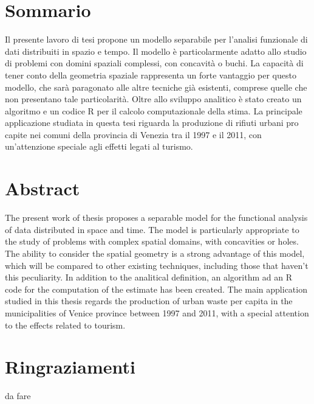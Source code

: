 \documentclass[a4paper,11pt,twoside,openright]{book}							%
\begin{document}
\chapter*{Sommario}
\label{Cap:sommario}
\thispagestyle{empty}
Il presente lavoro di tesi propone un modello separabile per l'analisi funzionale di dati distribuiti in spazio e tempo. Il modello è particolarmente adatto allo studio di problemi con domini spaziali complessi, con concavità o buchi. La capacità di tener conto della geometria spaziale rappresenta un forte vantaggio per questo modello, che sarà paragonato alle altre tecniche già esistenti, comprese quelle che non presentano tale particolarità. Oltre allo sviluppo analitico è stato creato un algoritmo e un codice R per il calcolo computazionale della stima. La principale applicazione studiata in questa tesi riguarda la produzione di rifiuti urbani pro capite nei comuni della provincia di Venezia tra il 1997 e il 2011, con un'attenzione speciale agli effetti legati al turismo.

\newpage
\thispagestyle{empty}
\chapter*{Abstract}
\label{Cap:abstract}
\thispagestyle{empty}
The present work of thesis proposes a separable model for the functional analysis of data distributed in space and time. The model is particularly appropriate to the study of problems with complex spatial domains, with concavities or holes. The ability to consider the spatial geometry is a strong advantage of this model, which will be compared to other existing techniques, including those that haven't this peculiarity. In addition to the analitical definition, an algorithm ad an R code for the computation of the estimate has been created. The main application studied in this thesis regards the production of urban waste per capita in the municipalities of Venice province between 1997 and 2011, with a special attention to the effects related to tourism.
\newpage
\thispagestyle{empty}

\chapter*{Ringraziamenti}
\thispagestyle{empty}
da fare
\newpage
\thispagestyle{empty}

\frontmatter
\tableofcontents
{}
\listoffigures
{}
\listoftables
{}
\newpage
\thispagestyle{empty}
\mainmatter
\end{document}
